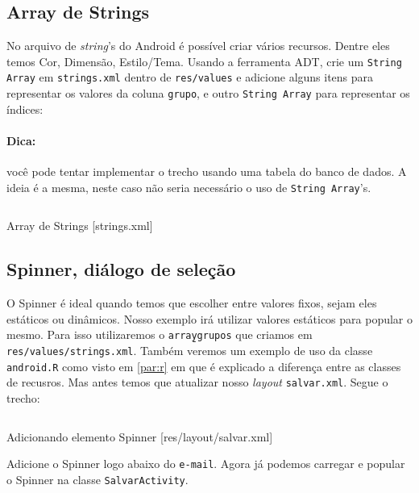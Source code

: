 \subsection{Array de Strings}

No arquivo de \textit{string}'s do Android é possível criar vários recursos. Dentre eles temos Cor,
Dimensão, Estilo/Tema. Usando a ferramenta ADT, crie um \texttt{String Array} em \texttt{strings.xml}
dentro de \texttt{res/values} e adicione alguns itens para representar os valores da coluna \texttt{grupo},
e outro \texttt{String Array} para representar os índices:

\paragraph{Dica:} você pode tentar implementar o trecho usando uma tabela do banco de dados. A ideia
é a mesma, neste caso não seria necessário o uso de \texttt{String Array}'s.

\begin{listing}[H]
  \inputminted[linenos=true,frame=bottomline,tabsize=3]{ xml }{ source/strings-1.xml }
  \caption{Array de Strings [strings.xml]}
\end{listing}

\subsection{Spinner, diálogo de seleção}

O Spinner é ideal quando temos que escolher entre valores fixos, sejam eles estáticos ou dinâmicos.
Nosso exemplo irá utilizar valores estáticos para popular o mesmo. Para isso utilizaremos o
\texttt{array\b{ }grupos} que criamos em \texttt{res/values/strings.xml}. Também veremos um exemplo
de uso da classe \texttt{android.R} como visto em \ref{par:r} em que é explicado a diferença entre
as classes de recusros. Mas antes temos que atualizar nosso \textit{layout} \texttt{salvar.xml}.
Segue o trecho:

\begin{listing}[H]
  \inputminted[linenos=true,frame=bottomline,tabsize=3]{ xml }{ source/salvar-3.xml }
  \caption{Adicionando elemento Spinner [res/layout/salvar.xml]}
\end{listing}

Adicione o Spinner logo abaixo do \texttt{e-mail}. Agora já podemos carregar e popular o Spinner
na classe \texttt{SalvarActivity}.

